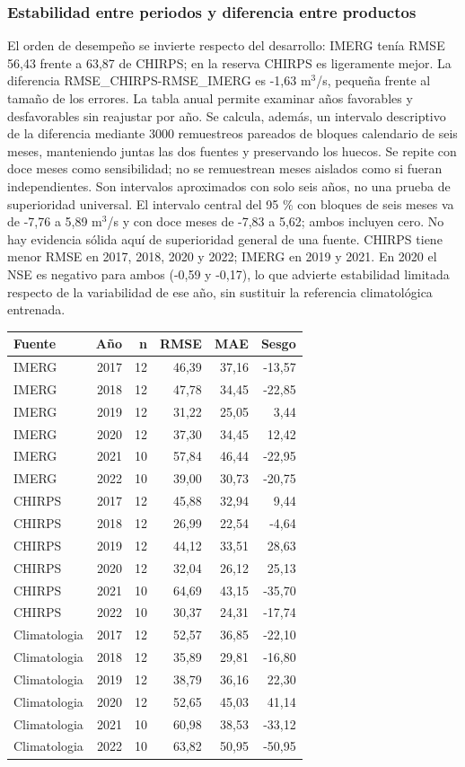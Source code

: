 \subsubsection*{Estabilidad entre periodos y diferencia entre productos}
El orden de desempeño se invierte respecto del desarrollo: IMERG tenía RMSE 56,43 frente a 63,87 de CHIRPS; en la reserva CHIRPS es ligeramente mejor. La diferencia RMSE\_CHIRPS-RMSE\_IMERG es -1,63 m$^3$/s, pequeña frente al tamaño de los errores. La tabla anual permite examinar años favorables y desfavorables sin reajustar por año. Se calcula, además, un intervalo descriptivo de la diferencia mediante 3000 remuestreos pareados de bloques calendario de seis meses, manteniendo juntas las dos fuentes y preservando los huecos. Se repite con doce meses como sensibilidad; no se remuestrean meses aislados como si fueran independientes. Son intervalos aproximados con solo seis años, no una prueba de superioridad universal. El intervalo central del 95 \% con bloques de seis meses va de -7,76 a 5,89 m$^3$/s y con doce meses de -7,83 a 5,62; ambos incluyen cero. No hay evidencia sólida aquí de superioridad general de una fuente. CHIRPS tiene menor RMSE en 2017, 2018, 2020 y 2022; IMERG en 2019 y 2021. En 2020 el NSE es negativo para ambos (-0,59 y -0,17), lo que advierte estabilidad limitada respecto de la variabilidad de ese año, sin sustituir la referencia climatológica entrenada.
\begin{center}\small\begin{tabular}{lrrrrr}\hline
Fuente & Año & n & RMSE & MAE & Sesgo \\ \hline
IMERG & 2017 & 12 & 46,39 & 37,16 & -13,57 \\
IMERG & 2018 & 12 & 47,78 & 34,45 & -22,85 \\
IMERG & 2019 & 12 & 31,22 & 25,05 & 3,44 \\
IMERG & 2020 & 12 & 37,30 & 34,45 & 12,42 \\
IMERG & 2021 & 10 & 57,84 & 46,44 & -22,95 \\
IMERG & 2022 & 10 & 39,00 & 30,73 & -20,75 \\
CHIRPS & 2017 & 12 & 45,88 & 32,94 & 9,44 \\
CHIRPS & 2018 & 12 & 26,99 & 22,54 & -4,64 \\
CHIRPS & 2019 & 12 & 44,12 & 33,51 & 28,63 \\
CHIRPS & 2020 & 12 & 32,04 & 26,12 & 25,13 \\
CHIRPS & 2021 & 10 & 64,69 & 43,15 & -35,70 \\
CHIRPS & 2022 & 10 & 30,37 & 24,31 & -17,74 \\
Climatologia & 2017 & 12 & 52,57 & 36,85 & -22,10 \\
Climatologia & 2018 & 12 & 35,89 & 29,81 & -16,80 \\
Climatologia & 2019 & 12 & 38,79 & 36,16 & 22,30 \\
Climatologia & 2020 & 12 & 52,65 & 45,03 & 41,14 \\
Climatologia & 2021 & 10 & 60,98 & 38,53 & -33,12 \\
Climatologia & 2022 & 10 & 63,82 & 50,95 & -50,95 \\
\hline\end{tabular}\end{center}
